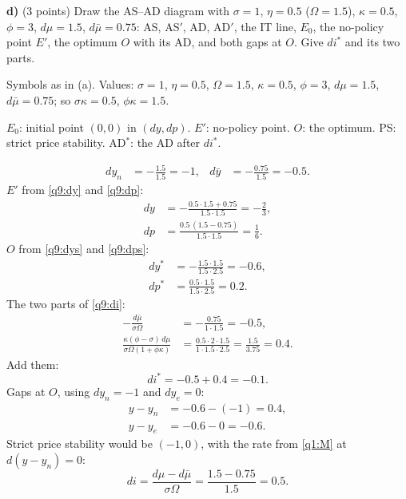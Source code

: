 \textbf{d)} (3 points) Draw the AS--AD diagram with $\sigma=1$, $\eta=0.5$ ($\Omega=1.5$), $\kappa=0.5$, $\phi=3$, $d\mu=1.5$, $d\bar\mu=0.75$: AS, AS$'$, AD, AD$'$,
the IT line, $E_0$, the no-policy point $E'$, the optimum $O$ with its AD, and both gaps at $O$. Give $di^*$ and its two parts.
\resolespaco
\begin{sol}
\begin{notacao}
\item Symbols as in (a). Values: $\sigma=1$, $\eta=0.5$, $\Omega=1.5$, $\kappa=0.5$, $\phi=3$, $d\mu=1.5$, $d\bar\mu=0.75$; so $\sigma\kappa=0.5$, $\phi\kappa=1.5$.
\item $E_0$: initial point $(0,0)$ in $(dy,dp)$. $E'$: no-policy point. $O$: the optimum. PS: strict price stability. AD$^*$: the AD after $di^*$.
\end{notacao}
\begin{align*}
dy_n&=-\tfrac{1.5}{1.5}=-1, & d\bar y&=-\tfrac{0.75}{1.5}=-0.5 .
\end{align*}
$E'$ from \eqref{q9:dy} and \eqref{q9:dp}:
\begin{align*}
dy&=-\frac{0.5\cdot1.5+0.75}{1.5\cdot1.5}=-\frac{2}{3},\\
dp&=\frac{0.5\,(1.5-0.75)}{1.5\cdot1.5}=\frac16 .
\end{align*}
$O$ from \eqref{q9:dys} and \eqref{q9:dps}:
\begin{align*}
dy^*&=-\frac{1.5\cdot1.5}{1.5\cdot2.5}=-0.6,\\
dp^*&=\frac{0.5\cdot1.5}{1.5\cdot2.5}=0.2 .
\end{align*}
The two parts of \eqref{q9:di}:
\begin{align*}
-\frac{d\bar\mu}{\sigma\Omega}&=-\frac{0.75}{1\cdot1.5}=-0.5,\\
\frac{\kappa(\phi-\sigma)\,d\mu}{\sigma\Omega(1+\phi\kappa)}&=\frac{0.5\cdot2\cdot1.5}{1\cdot1.5\cdot2.5}=\frac{1.5}{3.75}=0.4 .
\end{align*}
Add them:
\begin{equation}
di^*=-0.5+0.4=-0.1 . \nonumber
\end{equation}
Gaps at $O$, using $dy_n=-1$ and $dy_e=0$:
\begin{align*}
y-y_n&=-0.6-(-1)=0.4,\\
y-y_e&=-0.6-0=-0.6 .
\end{align*}
Strict price stability would be $(-1,0)$, with the rate from \eqref{q1:M} at $d(y-y_n)=0$:
\begin{equation}
di=\frac{d\mu-d\bar\mu}{\sigma\Omega}=\frac{1.5-0.75}{1.5}=0.5 . \nonumber

\end{equation}
\end{sol}
